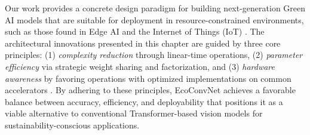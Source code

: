 \documentclass[12pt, a4paper]{article}
\begin{document}
Our work provides a concrete design paradigm for building next-generation Green AI models that are suitable for deployment in resource-constrained environments, such as those found in Edge AI and the Internet of Things (IoT) \cite{verhelst2020machine, li2021survey}. The architectural innovations presented in this chapter are guided by three core principles: (1) \textit{complexity reduction} through linear-time operations, (2) \textit{parameter efficiency} via strategic weight sharing and factorization, and (3) \textit{hardware awareness} by favoring operations with optimized implementations on common accelerators \cite{sze2017efficient}. By adhering to these principles, EcoConvNet achieves a favorable balance between accuracy, efficiency, and deployability that positions it as a viable alternative to conventional Transformer-based vision models for sustainability-conscious applications.






\end{document}
